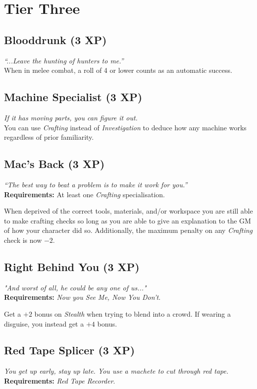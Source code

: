 \section{Tier Three}

\subsection{Blooddrunk (3 XP)}
\textit{``...Leave the hunting of hunters to me.''}\\
When in melee combat, a roll of 4 or lower counts as an automatic success.

\subsection{Machine Specialist (3 XP)}
\textit{If it has moving parts, you can figure it out.}\\
You can use \textit{Crafting} instead of \textit{Investigation} to deduce how any machine works regardless of prior familiarity.

\subsection{Mac's Back (3 XP)}
\textit{``The best way to beat a problem is to make it work for you.''}\\
\textbf{Requirements:} At least one \textit{Crafting} specialisation.

When deprived of the correct tools, materials, and/or workspace you are still able to make crafting checks so long as you are able to give an explanation to the GM of how your character did so.
Additionally, the maximum penalty on any \textit{Crafting} check is now $-2$.

\subsection{Right Behind You (3 XP)}
\textit{"And worst of all, he could be any one of us..."}\\
\textbf{Requirements:} \textit{Now you See Me, Now You Don't}.

Get a $+2$ bonus on \textit{Stealth} when trying to blend into a crowd.
If wearing a disguise, you instead get a $+4$ bonus.

\subsection{Red Tape Splicer (3 XP)}
\textit{You get up early, stay up late. You use a machete to cut through red tape.}\\
\textbf{Requirements:} \textit{Red Tape Recorder}.

